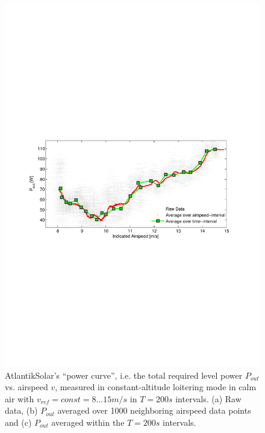 \begin{figure}[tb]
    \centering
     \includegraphics[width=\linewidth]{images/PowerMeasurements/PowerMeasurements}
    \caption{AtlantikSolar's ``power curve'', i.e. the total required level power $P_{out}$ vs. airspeed $v$, measured in constant-altitude loitering mode in calm air with $v_{ref}=const=8...15m/s$ in $T=200s$ intervals. (a) Raw data, (b) $P_{out}$ averaged over 1000 neighboring airspeed data points and (c) $P_{out}$ averaged within the $T=200s$ intervals.} 
    \label{fig:PowerMeasurements}
\end{figure}


